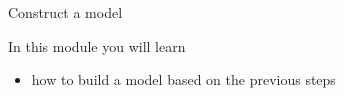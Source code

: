 \standardonlynewpage

%
%



\begin{module}{Construct a model}
	\label{model}

\begin{siam}

In this module you will learn
\begin{itemize}
	\item how to build a model based on the previous steps
\end{itemize}

\hfill

	
	
\end{siam}

\end{module}



